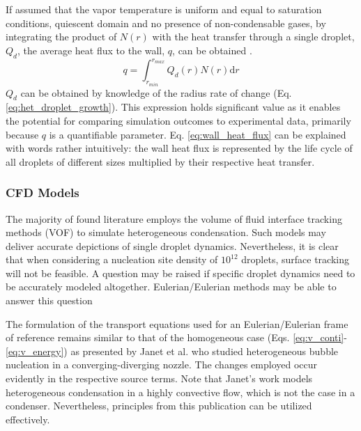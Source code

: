 \documentclass[12pt]{article}
\numberwithin{equation}{section}
\begin{document}
If assumed that the vapor temperature is uniform and equal to saturation conditions, quiescent domain and no presence of non-condensable gases, by integrating the product of $N(r)$ with the heat transfer through a single droplet, $Q_{d}$, the average heat flux to the wall, $q$, can be obtained \cite{marengo2022surface}.
\begin{equation}\label{eq:wall_heat_flux}
    q=\int_{r_{min}}^{r_{max}}Q_{d}(r)N(r)\mathrm{d}r 
\end{equation} 
$Q_{d}$ can be obtained by knowledge of the radius rate of change (Eq. \ref{eq:het_droplet_growth}). This expression holds significant value as it enables the potential for comparing simulation outcomes to experimental data, primarily because $q$ is a quantifiable parameter. Eq. \ref{eq:wall_heat_flux} can be explained with words rather intuitively: the wall heat flux is represented by the life cycle of all droplets of different sizes multiplied by their respective heat transfer.
\subsubsection{CFD Models}\label{sss:Literature-Heterogeneous-CFD}
The majority of found literature employs the volume of fluid interface tracking methods (VOF) to simulate heterogeneous condensation. Such models may deliver accurate depictions of single droplet dynamics. Nevertheless, it is clear that when considering a nucleation site density of $10^{12}$ droplets, surface tracking will not be feasible. A question may be raised if specific droplet dynamics need to be accurately modeled altogether. Eulerian/Eulerian methods may be able to answer this question

The formulation of the transport equations used for an Eulerian/Eulerian frame of reference remains similar to that of the homogeneous case (Eqs. \ref{eq:v_conti}-\ref{eq:v_energy}) as presented by Janet et al. \cite{janet2015heterogeneous} who studied heterogeneous bubble nucleation in a converging-diverging nozzle. The changes employed occur evidently in the respective source terms. Note that Janet's work models heterogeneous condensation in a highly convective flow, which is not the case in a condenser. Nevertheless, principles from this publication can be utilized effectively.
\end{document}
